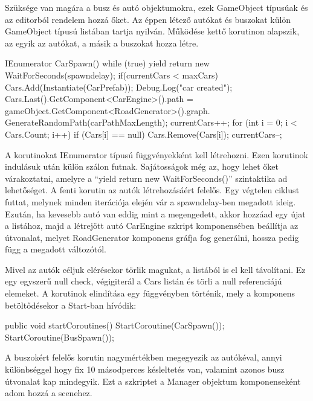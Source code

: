 Szüksége van magára a busz és autó objektumokra, ezek GameObject típusúak és az editorból rendelem hozzá őket. Az éppen létező autókat és buszokat külön GameObject típusú listában tartja nyilván.
Működése kettő korutinon alapszik, az egyik az autókat, a másik a buszokat hozza létre.
\begin{cpp}
IEnumerator CarSpawn()
{
    while (true)
    {
        yield return new WaitForSeconds(spawndelay);
        if(currentCars < maxCars)
        {
            Cars.Add(Instantiate(CarPrefab));
            Debug.Log("car created");
            Cars.Last().GetComponent<CarEngine>().path = 
            gameObject.GetComponent<RoadGenerator>().graph.
            GenerateRandomPath(carPathMaxLength);
            currentCars++;
        }
        for (int i = 0; i < Cars.Count; i++)
        {
            if (Cars[i] == null)
            {
                Cars.Remove(Cars[i]);
                currentCars--;
            }
        }
     }           
}
\end{cpp}
A korutinokat IEnumerator típusú függvényekként kell létrehozni. Ezen korutinok indulásuk után külön szálon futnak. Sajátosságok még az, hogy lehet őket várakoztatni, amelyre a ``yield return new WaitForSeconds()'' szintaktika ad lehetőséget.
A fenti korutin az autók létrehozásáért felelős. Egy végtelen ciklust futtat, melynek minden iterációja elején vár a spawndelay-ben megadott ideig. Ezután, ha kevesebb autó van eddig mint a megengedett, akkor hozzáad egy újat a listához, majd a létrejött autó CarEngine szkript komponensében beállítja az útvonalat, melyet RoadGenerator komponens gráfja fog generálni, hossza pedig függ a megadott változótól.

Mivel az autók céljuk elérésekor törlik magukat, a listából is el kell távolítani. Ez egy egyszerű null check, végigiterál a Cars listán és törli a null referenciájú elemeket.
A korutinok elindítása egy függvényben történik, mely a komponens betöltődésekor a Start-ban hívódik:
\begin{cpp}
public void startCoroutines()
        {
            StartCoroutine(CarSpawn());
            StartCoroutine(BusSpawn());
        }
\end{cpp}
A buszokért felelős korutin nagymértékben megegyezik az autókéval, annyi különbséggel hogy fix 10 másodperces késleltetés van, valamint azonos busz útvonalat kap mindegyik.
Ezt a szkriptet a Manager objektum komponenseként adom hozzá a scenehez.

